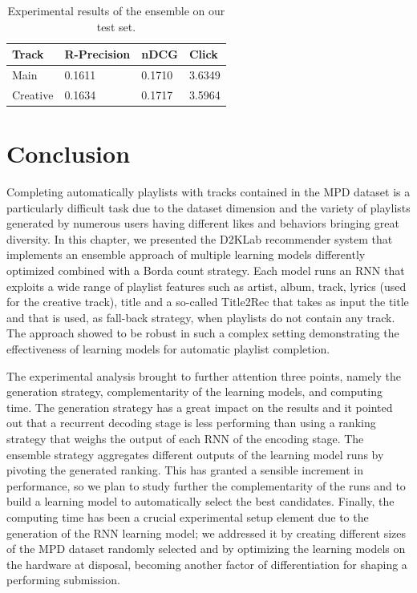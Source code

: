 \begin{table}
\centering
\begin{tabular}{@{}llll@{}}
\toprule
Track    & R-Precision & nDCG   & Click  \\ \midrule
Main     & 0.1611      & 0.1710 & 3.6349 \\
Creative & 0.1634      & 0.1717 & 3.5964 \\ \bottomrule
\end{tabular}
\caption[Results of the ensemble]{Experimental results of the ensemble on our test set.}
\label{rnn:tab:ensemble}
\end{table}

\section{Conclusion}
\label{rnn:sec:conclusion}

Completing automatically playlists with tracks contained in the MPD dataset is a particularly difficult task due to the dataset dimension and the variety of playlists generated by numerous users having different likes and behaviors bringing great diversity. In this chapter, we presented the D2KLab recommender system that implements an ensemble approach of multiple learning models differently optimized combined with a Borda count strategy. Each model runs an RNN that exploits a wide range of playlist features such as artist, album, track, lyrics (used for the creative track), title and a so-called Title2Rec that takes as input the title and that is used, as fall-back strategy, when playlists do not contain any track. The approach showed to be robust in such a complex setting demonstrating the effectiveness of learning models for automatic playlist completion.

The experimental analysis brought to further attention three points, namely the generation strategy, complementarity of the learning models, and computing time. The generation strategy has a great impact on the results and it pointed out that a recurrent decoding stage is less performing than using a ranking strategy that weighs the output of each RNN of the encoding stage. The ensemble strategy aggregates different outputs of the learning model runs by pivoting the generated ranking. This has granted a sensible increment in performance, so we plan to study further the complementarity of the runs and to build a learning model to automatically select the best candidates. Finally, the computing time has been a crucial experimental setup element due to the generation of the RNN learning model; we addressed it by creating different sizes of the MPD dataset randomly selected and by optimizing the learning models on the hardware at disposal, becoming another factor of differentiation for shaping a performing submission.
